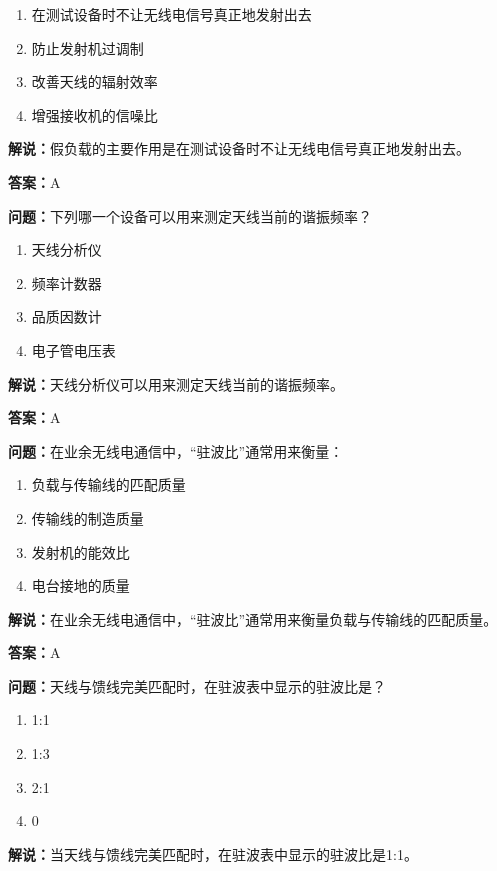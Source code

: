 \begin{enumerate}[label=\Alph*), leftmargin=3em]
	\item 在测试设备时不让无线电信号真正地发射出去
	\item 防止发射机过调制
	\item 改善天线的辐射效率
	\item 增强接收机的信噪比
\end{enumerate}

\textbf{解说：}假负载的主要作用是在测试设备时不让无线电信号真正地发射出去。%

\textbf{答案：}A

\textbf{问题：}下列哪一个设备可以用来测定天线当前的谐振频率？

\begin{enumerate}[label=\Alph*), leftmargin=3em]
	\item 天线分析仪
	\item 频率计数器
	\item 品质因数计
	\item 电子管电压表
\end{enumerate}

\textbf{解说：}天线分析仪可以用来测定天线当前的谐振频率。

\textbf{答案：}A

\textbf{问题：}在业余无线电通信中，“驻波比”通常用来衡量：

\begin{enumerate}[label=\Alph*), leftmargin=3em]
	\item 负载与传输线的匹配质量
	\item 传输线的制造质量
	\item 发射机的能效比
	\item 电台接地的质量
\end{enumerate}

\textbf{解说：}在业余无线电通信中，“驻波比”通常用来衡量负载与传输线的匹配质量。%

\textbf{答案：}A

\textbf{问题：}天线与馈线完美匹配时，在驻波表中显示的驻波比是？

\begin{enumerate}[label=\Alph*), leftmargin=3em]
	\item 1:1
	\item 1:3
	\item 2:1
	\item 0
\end{enumerate}

\textbf{解说：}当天线与馈线完美匹配时，在驻波表中显示的驻波比是1:1。%

